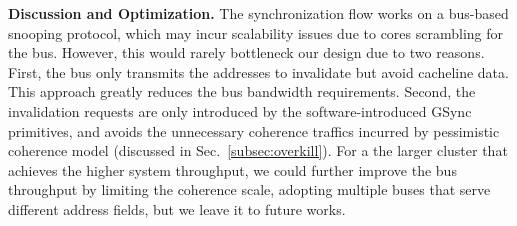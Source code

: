 

\ifx\stale\undefined
\noindent \textbf{Discussion and Optimization. }
The synchronization flow works on a bus-based snooping protocol, which may incur scalability issues due to cores scrambling for the bus. However, this would rarely bottleneck our design due to two reasons. 
First, the bus only transmits the addresses to invalidate but avoid cacheline data. This approach greatly reduces the bus bandwidth requirements. 
Second, the invalidation requests are only introduced by the software-introduced GSync primitives, and avoids the unnecessary coherence traffics incurred by pessimistic coherence model (discussed in Sec.~\ref{subsec:overkill}). 
For a the larger cluster that achieves the higher system throughput, we could further improve the bus throughput by limiting the coherence scale, adopting multiple buses that serve different address fields, but we leave it to future works. 
\fi


